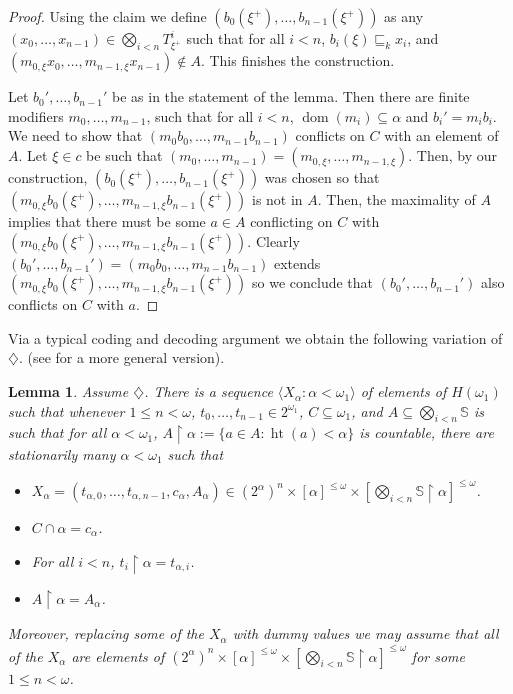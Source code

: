 \documentclass[a4paper,noamsfonts]{amsart}
\newtheorem{lemma}[theorem]{Lemma}
\theoremstyle{definition}
\newcommand{\seb}{\subseteq}
\newcommand{\tleq}{\sqsubseteq}
\newcommand{\res}{\!\upharpoonright\!}
\newcommand{\tup}[1]{\langle#1\rangle}
\newcommand{\1}{\mathbbm{1}}
\newcommand{\dia}{\diamondsuit}
\renewcommand{\S}{\mathbb{S}}
\DeclareMathOperator{\dom}{dom}
\DeclareMathOperator{\hht}{ht}
\begin{document}
\begin{proof}
  Using the claim we define
  $(b_{0}(\xi^{+}),\dots,b_{n-1}(\xi^{+}))$
  as any $(x_{0},\dots,x_{n-1}) \in \bigotimes_{i <n}T^{i}_{\xi^{+}}$ such that
  for all $i <n$, $b_{i}(\xi) \tleq_{k} x_{i}$, and
  $(m_{0,\xi} x_{0},\dots,m_{n-1,\xi} x_{n-1}) \notin A$. This finishes the
  construction.
  
  Let $b_{0}',\dots,b_{n-1}'$ be
  as in the statement of the lemma. Then there are finite modifiers
  $m_{0},\dots,m_{n-1}$, such that for all $i < n$, $\dom(m_{i}) \seb \alpha$
  and $b_{i}' = m_{i} b_{i}$. We need to show
  that $(m_{0}b_{0},\dots,m_{n-1}b_{n-1})$ conflicts on $C$
  with an element of $A$.
  Let $\xi \in c$ be such that
  $(m_{0},\dots,m_{n-1}) = (m_{0,\xi},\dots,m_{n-1,\xi})$. Then, by our construction,
  $(b_{0}(\xi^{+}),\dots,b_{n-1}(\xi^{+}))$ was chosen so that
  $(m_{0,\xi}b_{0}(\xi^{+}),\dots,\allowbreak m_{n-1,\xi}b_{n-1}(\xi^{+}))$ is
  not in $A$. Then, the maximality of $A$ implies that there must be
  some $a \in A$ conflicting on $C$ with
  $(m_{0,\xi}b_{0}(\xi^{+}),\dots,\allowbreak m_{n-1,\xi}b_{n-1}(\xi^{+}))$. Clearly
  $(b_{0}',\dots,b_{n-1}') = (m_{0}b_{0},\dots,m_{n-1}b_{n-1})$ extends
  $(m_{0,\xi}b_{0}(\xi^{+}),\dots,\allowbreak m_{n-1,\xi}b_{n-1}(\xi^{+}))$
  so we conclude that
  $(b_{0}',\dots,b_{n-1}')$ also conflicts on $C$ with $a$.
\end{proof}

Via a typical coding and decoding argument we obtain the following
variation of $\dia$. (see \cite{BrodskyRinotI} for a more general version).

\begin{lemma}\label{lem:diamond}
  Assume $\dia$. There
  is a sequence $\tup{X_{\alpha} : \alpha < \omega_{1}}$ of
  elements of $H(\omega_{1})$ such that
  whenever $1 \le n < \omega$, $t_{0},\dots,t_{n-1} \in 2^{\omega_{1}}$,
  $C \seb \omega_{1}$, and
  $A \seb \bigotimes_{i < n}\S$ is such that for all $\alpha < \omega_{1}$,
  $A\res \alpha := \{a \in A : \hht(a) < \alpha\}$ is countable,
  there are stationarily many $\alpha < \omega_{1}$ such that
  \begin{itemize}
    \item $X_{\alpha} = (t_{\alpha,0},\dots,t_{\alpha,n-1},c_{\alpha},A_{\alpha})
    \in (2^{\alpha})^{n}\times [\alpha]^{\le\omega}\times
    [\bigotimes_{i <n} \S\res \alpha]^{\le \omega}$.
    \item $C \cap \alpha = c_{\alpha}$.
    \item For all $i < n$, $t_{i}\res \alpha = t_{\alpha,i}$.
    \item $A \res \alpha = A_{\alpha}$.
  \end{itemize}
  Moreover, replacing some of the $X_{\alpha}$ with dummy values
  we  may assume that all of the $X_{\alpha}$ are
  elements of $(2^{\alpha})^{n}\times [\alpha]^{\le\omega}\times
    [\bigotimes_{i <n} \S\res \alpha]^{\le\omega}$
  for some $1 \le n < \omega$.
\end{lemma}
\end{document}
